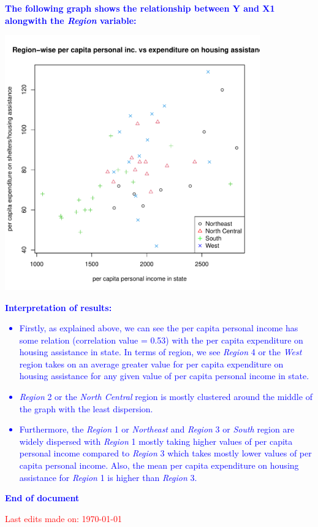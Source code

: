 \documentclass[12pt,letterpaper]{article}
\begin{document}
\begin{itemize}
  

\textcolor{blue}{
	\noindent \textbf{The following graph shows the relationship between Y and X1 alongwith the \textit{Region} variable:}
}
\begin{center}
	\includegraphics[width=11cm]{plot_Y_X1_new.pdf}  
\end{center}

\pagebreak

\textcolor{blue}{
	\textbf{Interpretation of results:}\\
\begin{itemize}
\item Firstly, as explained above, we can see the per capita personal income has some relation (correlation value = 0.53) with the per capita expenditure on housing assistance in state. In terms of region, we see \textit{Region} 4 or the \textit{West} region takes on an average greater value for per capita expenditure on housing assistance for any given value of per capita personal income in state.
\item \textit{Region} 2 or the \textit{North Central} region is mostly clustered around the middle of the graph with the least dispersion.
\item Furthermore, the \textit{Region} 1 or \textit{Northeast} and \textit{Region} 3 or \textit{South} region are widely dispersed with \textit{Region} 1 mostly taking higher values of per capita personal income compared to \textit{Region} 3 which takes mostly lower values of per capita personal income. Also, the mean per capita expenditure on housing assistance for \textit{Region} 1 is higher than \textit{Region} 3.
\end{itemize}
}

\end{itemize}
\vspace{2cm}
\begin{center}
\textcolor{blue}{\textbf{End of document}\\}
\end{center}
\vspace{10cm}
\textcolor{red}{Last edits made on: \today}
\end{document}
